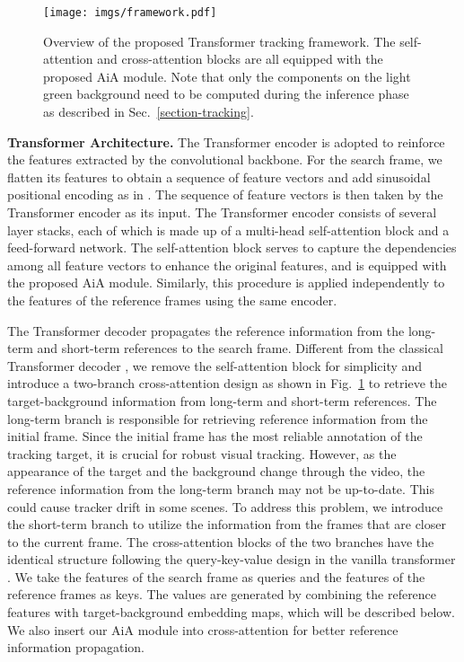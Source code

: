 \documentclass[runningheads]{llncs}
\begin{document}
\begin{figure}[t]
\centering
\texttt{[image: imgs/framework.pdf]}
\caption{Overview of the proposed Transformer tracking framework. The self-attention and cross-attention blocks are all equipped with the proposed AiA module. Note that only the components on the light green background need to be computed during the inference phase as described in Sec.~\ref{section-tracking}.}
\label{figure-framework}
\end{figure}

\textbf{Transformer Architecture.} The Transformer encoder is adopted to reinforce the features extracted by the convolutional backbone. For the search frame, we flatten its features to obtain a sequence of feature vectors and add sinusoidal positional encoding as in \cite{carion2020end}. The sequence of feature vectors is then taken by the Transformer encoder as its input. The Transformer encoder consists of several layer stacks, each of which is made up of a multi-head self-attention block and a feed-forward network. The self-attention block serves to capture the dependencies among all feature vectors to enhance the original features, and is equipped with the proposed AiA module. Similarly, this procedure is applied independently to the features of the reference frames using the same encoder.

The Transformer decoder propagates the reference information from the long-term and short-term references to the search frame. Different from the classical Transformer decoder \cite{vaswani2017attention}, we remove the self-attention block for simplicity and introduce a two-branch cross-attention design as shown in Fig.~\ref{figure-framework} to retrieve the target-background information from long-term and short-term references. The long-term branch is responsible for retrieving reference information from the initial frame. Since the initial frame has the most reliable annotation of the tracking target, it is crucial for robust visual tracking. However, as the appearance of the target and the background change through the video, the reference information from the long-term branch may not be up-to-date. This could cause tracker drift in some scenes. To address this problem, we introduce the short-term branch to utilize the information from the frames that are closer to the current frame. The cross-attention blocks of the two branches have the identical structure following the query-key-value design in the vanilla transformer \cite{vaswani2017attention}. We take the features of the search frame as queries and the features of the reference frames as keys. The values are generated by combining the reference features with target-background embedding maps, which will be described below. We also insert our AiA module into cross-attention for better reference information propagation.
\end{document}
